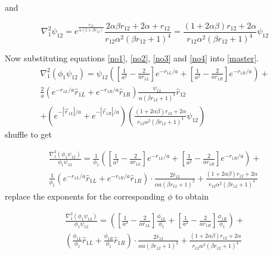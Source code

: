 \documentclass{article}
\begin{document}
and 

\begin{equation}
\label{no4}
 \nabla_1^2 \psi_{12}=e^{\frac{r_{12} }{\alpha(1+\beta r_{12} ) }} \frac{2\alpha \beta r_{12} + 2\alpha+r_{12}}{r_{12}\alpha^2(\beta r_{12}+1)^4} =  \frac{(1+2\alpha \beta) r_{12} + 2\alpha}{r_{12}\alpha^2(\beta r_{12}+1)^4} \psi_{12}
\end{equation}

Now substituting equations \ref{no1}, \ref{no2}, \ref{no3} and \ref{no4} into \ref{master}.
\begin{multline}
 \nabla_1^2(\phi_1\psi_{12}) =\psi_{12} \left( \left[\frac{1}{a^2}-\frac{2}{a{r}_{1L}} \right] e^{-{r}_{1L}/a} + \left[\frac{1}{a^2}-\frac{2}{a{r}_{1R}} \right] e^{-{r}_{1R}/a}  \right) +\\ \frac2a \left(  e^{-{r}_{1L}/a}\hat{r}_{1L} +e^{-{r}_{1R}/a}\hat{r}_{1R} \right)\frac{\psi_{12}}{\alpha (\beta r_{12}+1)^2}\hat{r}_{12} \\ +\left( e^{-|\vec{r}_{1L}|/a} + e^{-|\vec{r}_{1R}|/a} \right) \left(   \frac{(1+2\alpha \beta) r_{12} + 2\alpha}{r_{12}\alpha^2(\beta r_{12}+1)^4} \psi_{12} \right)
\end{multline}
shuffle to get

\begin{multline}
 \frac{\nabla_1^2(\phi_1\psi_{12})}{\phi_1 \psi_{12}} =\frac{1}{\phi_1} \left( \left[\frac{1}{a^2}-\frac{2}{ar_{1L}} \right] e^{-r_{1L}/a} + \left[\frac{1}{a^2} - \frac{2}{ar_{1R}} \right] e^{-{r}_{1R}/a}  \right)   
+ \\ \frac{1}{\phi_1 } \left(  e^{-{r}_{1L}/a}\hat{r}_{1L} +e^{-{r}_{1R}/a}\hat{r}_{1R} \right) \cdot \frac{2\hat{r}_{12}}{\alpha a(\beta r_{12}+1)^2}+    \frac{(1+2\alpha \beta) r_{12} 
+ 2\alpha}{r_{12}\alpha^2(\beta r_{12}+1)^4} 
\end{multline}
replace the exponents for the corresponding $\phi$ to obtain

\begin{multline}
\frac{\nabla_1^2(\phi_1\psi_{12})}{\phi_1 \psi_{12}} 
 = \left( \left[\frac{1}{a^2}-\frac{2}{ar_{1L}} \right] \frac{\phi_{1L}}{\phi_1} + \left[\frac{1}{a^2} - \frac{2}{ar_{1R}} \right] \frac{\phi_{1R}}{\phi_1}   \right)   
 + \\ \left(  \frac{\phi_{1L}}{\phi_1}\hat{r}_{1L} +\frac{\phi_{1R}}{\phi_1}\hat{r}_{1R} \right) \cdot \frac{2\hat{r}_{12}}{\alpha a(\beta r_{12}+1)^2}+    \frac{(1+2\alpha \beta) r_{12} 
 + 2\alpha}{r_{12}\alpha^2(\beta r_{12}+1)^4} 
\end{multline}
\end{document}

